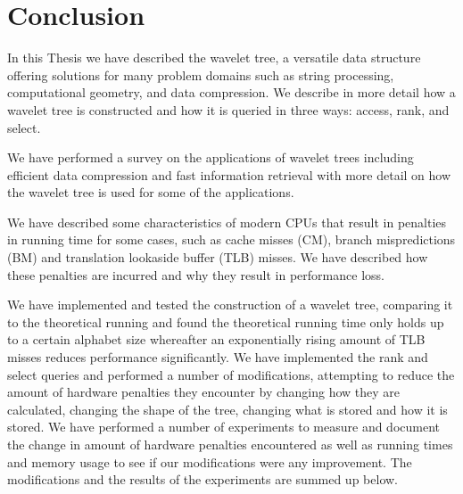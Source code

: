 \section{Conclusion}
In this Thesis we have described the wavelet tree, a versatile data structure offering solutions for many problem domains such as string processing, computational geometry, and data compression.
We describe in more detail how a wavelet tree is constructed and how it is queried in three ways: access, rank, and select.

We have performed a survey on the applications of wavelet trees including efficient data compression and fast information retrieval with more detail on how the wavelet tree is used for some of the applications.

We have described some characteristics of modern CPUs that result in penalties in running time for some cases, such as cache misses (CM), branch mispredictions (BM) and translation lookaside buffer (TLB) misses.
We have described how these penalties are incurred and why they result in performance loss.

We have implemented and tested the construction of a wavelet tree, comparing it to the theoretical running and found the theoretical running time only holds up to a certain alphabet size whereafter an exponentially rising amount of TLB misses reduces performance significantly.
We have implemented the rank and select queries and performed a number of modifications, attempting to reduce the amount of hardware penalties they encounter by changing how they are calculated, changing the shape of the tree, changing what is stored and how it is stored.
We have performed a number of experiments to measure and document the change in amount of hardware penalties encountered as well as running times and memory usage to see if our modifications were any improvement.
The modifications and the results of the experiments are summed up below.

